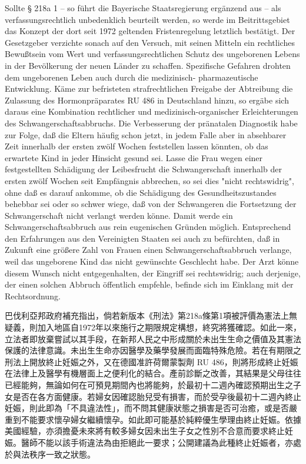 \documentclass[12pt]{article}
\begin{document}
\begin{sourcepara}[title={原文C.1}]
Sollte § 218a \abbrAbs{} 1 \abbrStGB{} \abbrNF{} -- so führt die Bayerische Staatsregierung ergänzend aus -- als verfassungsrechtlich unbedenklich beurteilt werden, so werde im Beitrittsgebiet das Konzept der dort seit 1972 geltenden Fristenregelung letztlich bestätigt. Der Gesetzgeber verzichte sonach auf den Versuch, mit seinen Mitteln ein rechtliches Bewußtsein vom Wert und verfassungsrechtlichen Schutz des ungeborenen Lebens in der Bevölkerung der neuen Länder zu schaffen. Spezifische Gefahren drohten dem ungeborenen Leben auch durch die medizinisch- pharmazeutische Entwicklung. Käme zur befristeten strafrechtlichen Freigabe der Abtreibung die Zulassung des Hormonpräparates RU 486 in Deutschland hinzu, so ergäbe sich daraus eine Kombination rechtlicher und medizinisch-organischer Erleichterungen des Schwangerschaftsabbruchs. Die Verbesserung der pränatalen Diagnostik habe zur Folge, daß die Eltern häufig schon jetzt, in jedem Falle aber in absehbarer Zeit innerhalb der ersten zwölf Wochen feststellen lassen könnten, ob das erwartete Kind in jeder Hinsicht gesund sei. Lasse die Frau wegen einer festgestellten Schädigung der Leibesfrucht die Schwangerschaft innerhalb der ersten zwölf Wochen seit Empfängnis abbrechen, so sei dies "nicht rechtswidrig", ohne daß es darauf ankomme, ob die Schädigung des Gesundheitszustandes behebbar sei oder so schwer wiege, daß von der Schwangeren die Fortsetzung der Schwangerschaft nicht verlangt werden könne. Damit werde ein Schwangerschaftsabbruch aus rein eugenischen Gründen möglich. Entsprechend den Erfahrungen aus den Vereinigten Staaten sei auch zu befürchten, daß in Zukunft eine größere Zahl von Frauen einen Schwangerschaftsabbruch verlange, weil das ungeborene Kind das nicht gewünschte Geschlecht habe. Der Arzt könne diesem Wunsch nicht entgegenhalten, der Eingriff sei rechtswidrig; auch derjenige, der einen solchen Abbruch öffentlich empfehle, befinde sich im Einklang mit der Rechtsordnung.
\end{sourcepara}

\begin{transpara}
巴伐利亞邦政府補充指出，倘若新版本《刑法》第218a條第1項被評價為憲法上無疑義，則加入地區自1972年以來施行之期限規定構想，終究將獲確認。如此一來，立法者即放棄嘗試以其手段，在新邦人民之中形成關於未出生生命之價值及其憲法保護的法律意識。未出生生命亦因醫學及藥學發展而面臨特殊危險。若在有期限之刑法上開放終止妊娠之外，又在德國准許荷爾蒙製劑 RU 486，則將形成終止妊娠在法律上及醫學有機層面上之便利化的結合。產前診斷之改善，其結果是父母往往已經能夠，無論如何在可預見期間內也將能夠，於最初十二週內確認預期出生之子女是否在各方面健康。若婦女因確認胎兒受有損害，而於受孕後最初十二週內終止妊娠，則此即為「不具違法性」，而不問其健康狀態之損害是否可治癒，或是否嚴重到不能要求懷孕婦女繼續懷孕。如此即可能基於純粹優生學理由終止妊娠。依據美國經驗，亦須擔憂未來將有較多婦女因未出生子女之性別不合意而要求終止妊娠。醫師不能以該手術違法為由拒絕此一要求；公開建議為此種終止妊娠者，亦處於與法秩序一致之狀態。
\end{transpara}
\end{document}
